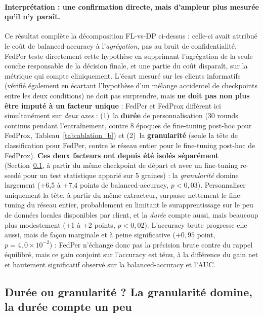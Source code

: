 \documentclass{article}
\begin{document}
\paragraph{Interprétation : une confirmation directe, mais d'ampleur plus mesurée
qu'il n'y paraît.} Ce résultat complète la décomposition FL-vs-DP ci-dessus : celle-ci
avait attribué le coût de balanced-accuracy à l'\emph{agrégation}, pas au bruit de
confidentialité. FedPer teste directement cette hypothèse en supprimant l'agrégation de
la seule couche responsable de la décision finale, et une partie du coût disparaît,
sur la métrique qui compte cliniquement. L'écart mesuré sur les clients informatifs
(vérifié également en écartant l'hypothèse d'un mélange accidentel de checkpoints entre
les deux conditions) ne doit pas surprendre, mais \textbf{ne doit pas non plus être
imputé à un facteur unique} : FedPer et FedProx diffèrent ici simultanément sur \emph{deux axes} :
(1)~la \textbf{durée} de personnalisation (30 rounds continus pendant l'entraînement,
contre 8 époques de fine-tuning post-hoc pour FedProx, Tableau~\ref{tab:ablation_b}) et
(2)~la \textbf{granularité} (seule la tête de classification pour FedPer, contre le
réseau entier pour le fine-tuning post-hoc de FedProx). \textbf{Ces deux facteurs ont
depuis été isolés séparément} (Section~\ref{subsec:duration_vs_granularity}, à partir
du même checkpoint de départ et avec un fine-tuning re-seedé pour un test statistique
apparié sur 5 graines) : la \emph{granularité} domine largement (+6,5 à +7,4 points de
balanced-accuracy, $p<0{,}03$). Personnaliser uniquement la tête, à partir du même
extracteur, surpasse nettement le fine-tuning du réseau entier, probablement en
limitant le surapprentissage sur le peu de données locales disponibles par client, et
la \emph{durée} compte aussi, mais beaucoup plus modestement (+1 à +2 points,
$p<0{,}02$).
L'accuracy brute progresse elle aussi, mais de façon marginale et à peine significative
($+0{,}95$ point, $p=4{,}0\times10^{-2}$) : FedPer n'échange donc pas la précision brute
contre du rappel équilibré, mais ce gain conjoint sur l'accuracy est ténu, à la
différence du gain net et hautement significatif observé sur la balanced-accuracy et
l'AUC.

\subsection{Durée ou granularité ? La granularité domine, la durée compte un peu}
\label{subsec:duration_vs_granularity}
\end{document}

